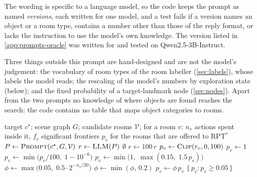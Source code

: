 \documentclass[10pt]{article}
\newcommand{\Nodes}{\mathcal{V}}
\newcommand{\cstar}{c^{\star}}              %
\begin{document}
The wording is specific to a language model, so the code keeps the prompt as
named \emph{versions}, each written for one model, and a test fails if a
version names an object or a room type, contains a number other than those of
the reply format, or lacks the instruction to use the model's own knowledge.
The version listed in \cref{app:prompts-oracle} was written for and tested on
Qwen2.5-3B-Instruct.

Three things outside this prompt are
hand-designed and are not the model's judgement: the vocabulary of room types
of the room labeller (\cref{sec:labels}), whose labels the model reads; the
rescaling of the model's numbers by exploration state (below); and the fixed
probability of a target-landmark node (\cref{sec:nodes}). Apart from the two
prompts no knowledge of where objects are found reaches the search: the code
contains no table that maps object categories to rooms.

\begin{algorithm}[t]
\caption{\textsc{RoomProbabilities}: the language model's reply, checked and
adjusted by exploration state.}
\label{alg:prob}
\small
\begin{algorithmic}[1]
\Require target $\cstar$; scene graph $G$; candidate rooms $\Nodes$; for a room $v$: $n_v$ actions spent inside it, $f_v$ significant frontiers
\Ensure $p_v$ for the rooms that are offered to RPT$^*$
\State $P \gets \textsc{Prompt}(\cstar, G, \Nodes)$ 
\State $r \gets \textsc{LLM}(P)$ 
    \State \Return $\emptyset$ 
\EndIf
{} 
    \State $r \gets 100\,r$
\EndIf
\ForAll{rooms $v \in \Nodes$}
    \State $p_v \gets \textsc{Clip}(r_v, 0, 100)$ 
        \State $p_v \gets 1$ 
    \EndIf
    \State $p_v \gets \min\bigl(p_v / 100,\; 1 - 10^{-6}\bigr)$
    \label{ln:prob-adjust-first}
        \State $p_v \gets \min\bigl(1,\; \max(0.15,\; 1.5\,p_v)\bigr)$
        \State $\phi \gets \max\bigl(0.05,\; 0.5 \cdot 2^{-n_v/20}\bigr)$ 
            \State $\phi \gets \min(\phi,\, 0.2)$
        \EndIf
        \State $p_v \gets \phi\, p_v$
    \EndIf\label{ln:prob-adjust-last}
\EndFor
\State \Return $\{\,p_v : p_v \ge 0.05\,\}$ 
\end{algorithmic}
\end{algorithm}
\end{document}
